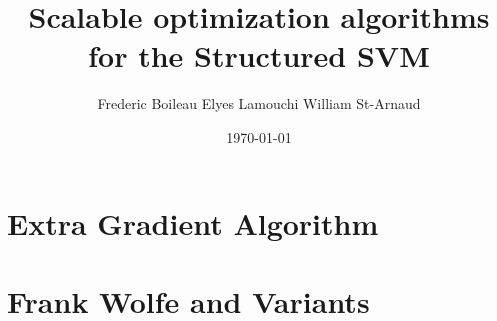 
\title{Scalable optimization algorithms for the Structured SVM}
\date{\today}
\author{Frederic Boileau Elyes Lamouchi William St-Arnaud}

\maketitle

\section{Extra Gradient Algorithm}

\section{Frank Wolfe and Variants}



